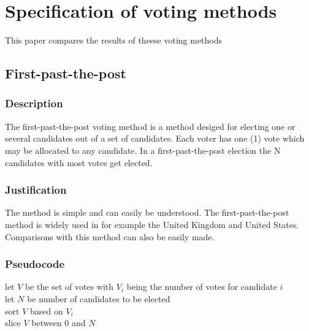 \pagebreak
\section{Specification of voting methods}
This paper compares the results of theese voting methods
\subsection{First-past-the-post}
\subsubsection{Description}
The first-past-the-post voting method is a method desiged for electing one or several candidates out of a set of candidates. Each voter has one (1) vote which may be allocated to any candidate. In a first-past-the-post election the N candidates with most votes get elected.
\subsubsection{Justification}
The method is simple and can easily be understood. The first-past-the-post method is widely used in for example the United Kingdom and United States. Comparisons with this method can also be easily made.
\subsubsection{Pseudocode}
let $V$ be the set of votes with $V_{i}$ being the number of votes for candidate $i$ \\
let $N$ be number of candidates to be elected \\
sort $V$ based on $V_{i}$\\
slice $V$ between $0$ and $N$
